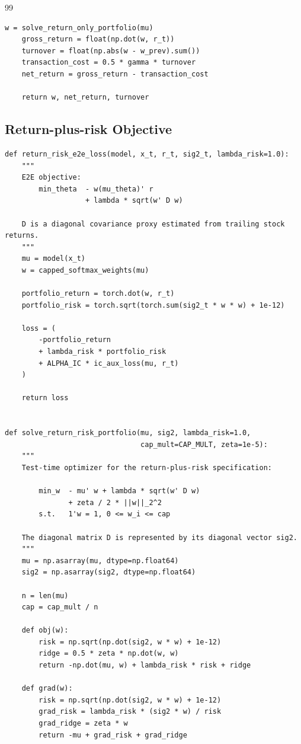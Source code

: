 \documentclass[11pt]{article}
\begin{document}
\begin{thebibliography}{99}
\begin{lstlisting}[style=appendixpython,caption={Core implementation of the return-only objective}]
    w = solve_return_only_portfolio(mu)
    gross_return = float(np.dot(w, r_t))
    turnover = float(np.abs(w - w_prev).sum())
    transaction_cost = 0.5 * gamma * turnover
    net_return = gross_return - transaction_cost

    return w, net_return, turnover
\end{lstlisting}

\subsection{Return-plus-risk Objective}

\begin{lstlisting}[style=appendixpython,caption={Core implementation of the return-plus-risk objective}]
def return_risk_e2e_loss(model, x_t, r_t, sig2_t, lambda_risk=1.0):
    """
    E2E objective:
        min_theta  - w(mu_theta)' r
                   + lambda * sqrt(w' D w)

    D is a diagonal covariance proxy estimated from trailing stock returns.
    """
    mu = model(x_t)
    w = capped_softmax_weights(mu)

    portfolio_return = torch.dot(w, r_t)
    portfolio_risk = torch.sqrt(torch.sum(sig2_t * w * w) + 1e-12)

    loss = (
        -portfolio_return
        + lambda_risk * portfolio_risk
        + ALPHA_IC * ic_aux_loss(mu, r_t)
    )

    return loss


def solve_return_risk_portfolio(mu, sig2, lambda_risk=1.0,
                                cap_mult=CAP_MULT, zeta=1e-5):
    """
    Test-time optimizer for the return-plus-risk specification:

        min_w  - mu' w + lambda * sqrt(w' D w)
               + zeta / 2 * ||w||_2^2
        s.t.   1'w = 1, 0 <= w_i <= cap

    The diagonal matrix D is represented by its diagonal vector sig2.
    """
    mu = np.asarray(mu, dtype=np.float64)
    sig2 = np.asarray(sig2, dtype=np.float64)

    n = len(mu)
    cap = cap_mult / n

    def obj(w):
        risk = np.sqrt(np.dot(sig2, w * w) + 1e-12)
        ridge = 0.5 * zeta * np.dot(w, w)
        return -np.dot(mu, w) + lambda_risk * risk + ridge

    def grad(w):
        risk = np.sqrt(np.dot(sig2, w * w) + 1e-12)
        grad_risk = lambda_risk * (sig2 * w) / risk
        grad_ridge = zeta * w
        return -mu + grad_risk + grad_ridge


\end{lstlisting}
\end{thebibliography}
\end{document}
